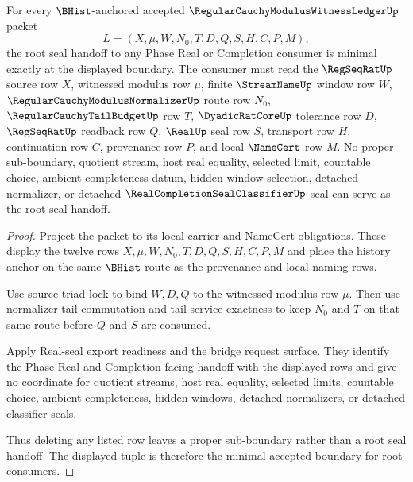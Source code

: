 \begin{theorem}
\label{thm:regular-cauchy-modulus-witness-ledger-root-seal-minimality}
For every $\BHist$-anchored accepted $\RegularCauchyModulusWitnessLedgerUp$ packet
$$
L=(X,\mu,W,N_0,T,D,Q,S,H,C,P,M),
$$
the root seal handoff to any Phase Real or Completion consumer is minimal exactly at the displayed boundary. The consumer must read the $\RegSeqRatUp$ source row $X$, witnessed modulus row $\mu$, finite $\StreamNameUp$ window row $W$, $\RegularCauchyModulusNormalizerUp$ route row $N_0$, $\RegularCauchyTailBudgetUp$ row $T$, $\DyadicRatCoreUp$ tolerance row $D$, $\RegSeqRatUp$ readback row $Q$, $\RealUp$ seal row $S$, transport row $H$, continuation row $C$, provenance row $P$, and local $\NameCert$ row $M$. No proper sub-boundary, quotient stream, host real equality, selected limit, countable choice, ambient completeness datum, hidden window selection, detached normalizer, or detached $\RealCompletionSealClassifierUp$ seal can serve as the root seal handoff.
\end{theorem}
\begin{proof}
Project the packet to its local carrier and NameCert obligations. These display the twelve rows $X,\mu,W,N_0,T,D,Q,S,H,C,P,M$ and place the history anchor on the same $\BHist$ route as the provenance and local naming rows.

Use source-triad lock to bind $W,D,Q$ to the witnessed modulus row $\mu$. Then use normalizer-tail commutation and tail-service exactness to keep $N_0$ and $T$ on that same route before $Q$ and $S$ are consumed.

Apply Real-seal export readiness and the bridge request surface. They identify the Phase Real and Completion-facing handoff with the displayed rows and give no coordinate for quotient streams, host real equality, selected limits, countable choice, ambient completeness, hidden windows, detached normalizers, or detached classifier seals.

Thus deleting any listed row leaves a proper sub-boundary rather than a root seal handoff. The displayed tuple is therefore the minimal accepted boundary for root consumers.
\end{proof}


